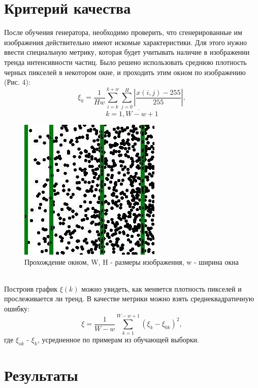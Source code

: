 \documentclass[a4paper]{article}
\begin{document}
	\section{Критерий качества}
		После обучения генератора, необходимо проверить, что сгенерированные им изображения действительно имеют искомые характеристики. Для этого нужно ввести специальную метрику, которая будет учитывать наличие в изображении тренда интенсивности частиц. Было решено использовать среднюю плотность черных пикселей в некотором окне, и проходить этим окном по изображению (Рис. 4):
		$$\xi_k = \frac{1}{H w}{\sum_{i=k}^{k+w} \sum_{j=0}^{H}\left| \frac{x(i, j) - 255}{255} \right|}, $$$$k = \overline{1, W - w + 1} $$
		\begin{figure}[h!]
			\begin{center}
				\includegraphics[width=0.35\linewidth]{metrics}
			\end{center}
			\caption{Прохождение окном, W, H - размеры изображения, w - ширина окна}
		\end{figure}
		\\
		Построив график $\xi(k)$ можно увидеть, как меняется плотность пикселей и прослеживается ли тренд. В качестве метрики можно взять среднеквадратичную ошибку:
		$$ \xi = \frac{1}{W-w}\sum_{k=1}^{W-w+1} (\xi_k - \xi_{0k})^2,$$
		где $\xi_{ok}$ - $\xi_k$, усредненное по примерам из обучающей выборки.
	\section{Результаты}
\end{document}
